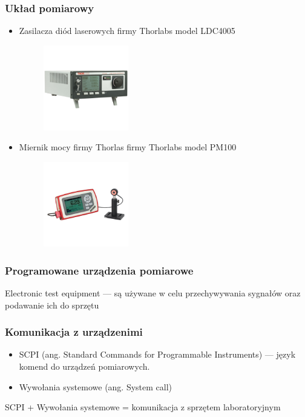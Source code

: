 \documentclass[xcolor={dvipsnames,table}]{beamer}
\begin{document}
\begin{frame}
\frametitle{Układ pomiarowy}
\begin{itemize}
\item Zasilacza diód laserowych firmy Thorlabs model LDC4005 
\begin{figure}
   \includegraphics[width=0.35\textwidth,natwidth=69,natheight=87]{ldc4005.jpg}
\end{figure}
\item Miernik mocy firmy Thorlas firmy Thorlabs model PM100
\begin{figure}
   \includegraphics[width=0.35\textwidth,natwidth=69,natheight=87]{pm100.jpg}
\end{figure}
\end{itemize}
\end{frame}


\begin{frame}
\frametitle{Programowane urządzenia pomiarowe}
Electronic test equipment --- są używane w celu przechywywania sygnałów oraz podawanie ich do sprzętu
\end{frame}

\begin{frame}
\frametitle{Komunikacja z urządzenimi}
\begin{itemize}
\item SCPI (ang. Standard Commands for Programmable Instruments) --- język komend do urządzeń pomiarowych.
\item Wywołania systemowe (ang. System call)
\end{itemize}
SCPI + Wywołania systemowe = komunikacja z sprzętem laboratoryjnym
\end{frame}
\end{document}
